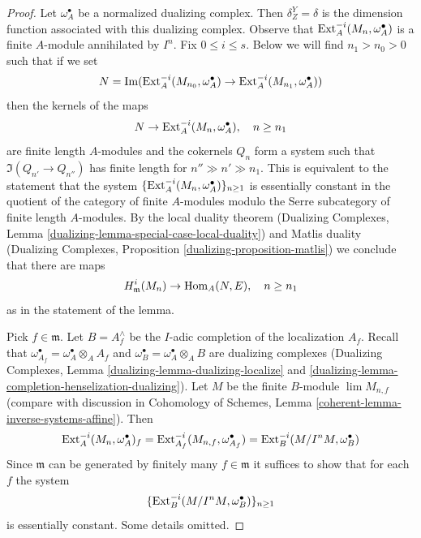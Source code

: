 \begin{proof}
Let $\omega_A^\bullet$ be a normalized dualizing complex. Then
$\delta^Y_Z = \delta$ is the dimension function associated with
this dualizing complex.
Observe that $\mathop{\mathrm{Ext}}\nolimits^{-i}_A(M_n, \omega_A^\bullet)$ is a finite $A$-module
annihilated by $I^n$. Fix $0 \leq i \leq s$.
Below we will find $n_1 > n_0 > 0$ such that if we set
$$
N = \mathop{\mathrm{Im}}(\mathop{\mathrm{Ext}}\nolimits^{-i}_A(M_{n_0}, \omega_A^\bullet) \to
\mathop{\mathrm{Ext}}\nolimits^{-i}_A(M_{n_1}, \omega_A^\bullet))
$$
then the kernels of the maps
$$
N \to \mathop{\mathrm{Ext}}\nolimits^{-i}_A(M_n, \omega_A^\bullet),\quad n \geq n_1
$$
are finite length $A$-modules and the cokernels $Q_n$ form a
system such that $\Im(Q_{n'} \to Q_{n''})$ has finite length
for $n'' \gg n' \gg n_1$. This is equivalent to the statement that
the system $\{\mathop{\mathrm{Ext}}\nolimits^{-i}_A(M_n, \omega_A^\bullet)\}_{n \geq 1}$
is essentially constant in the quotient of the category of finite
$A$-modules modulo the Serre subcategory of finite length $A$-modules.
By the local duality theorem
(Dualizing Complexes, Lemma \ref{dualizing-lemma-special-case-local-duality})
and Matlis duality
(Dualizing Complexes, Proposition \ref{dualizing-proposition-matlis})
we conclude that there are maps
$$
H^i_\mathfrak m(M_n) \to \mathop{\mathrm{Hom}}\nolimits_A(N, E),\quad n \geq n_1
$$
as in the statement of the lemma.

\medskip\noindent
Pick $f \in \mathfrak m$. Let $B = A_f^\wedge$ be the $I$-adic completion
of the localization $A_f$. Recall that
$\omega_{A_f}^\bullet = \omega_A^\bullet \otimes_A A_f$
and $\omega_B^\bullet = \omega_A^\bullet \otimes_A B$ are dualizing
complexes (Dualizing Complexes, Lemma \ref{dualizing-lemma-dualizing-localize}
and \ref{dualizing-lemma-completion-henselization-dualizing}).
Let $M$ be the finite $B$-module $\lim M_{n, f}$ (compare with
discussion in Cohomology of Schemes, Lemma
\ref{coherent-lemma-inverse-systems-affine}). Then
$$
\mathop{\mathrm{Ext}}\nolimits^{-i}_A(M_n, \omega_A^\bullet)_f =
\mathop{\mathrm{Ext}}\nolimits^{-i}_{A_f}(M_{n, f}, \omega_{A_f}^\bullet) =
\mathop{\mathrm{Ext}}\nolimits^{-i}_B(M/I^n M, \omega_B^\bullet)
$$
Since $\mathfrak m$ can be generated by finitely many $f \in \mathfrak m$
it suffices to show that for each $f$ the system
$$
\{\mathop{\mathrm{Ext}}\nolimits^{-i}_B(M/I^n M, \omega_B^\bullet)\}_{n \geq 1}
$$
is essentially constant. Some details omitted.


\end{proof}
